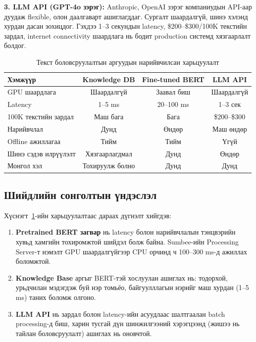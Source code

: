 \textbf{3. LLM API (GPT-4o зэрэг):}
Anthropic, OpenAI зэрэг компаниудын API-аар дуудаж flexible, олон даалгаварт ашиглагддаг. Сургалт шаардалгүй, шинэ хэлэнд хурдан дасан зохицдог. Гэхдээ 1--3 секундын latency, \$200--\$300/100K текстийн зардал, internet connectivity шаардлага нь бодит production системд хязгаарлалт болдог.

\begin{table}[h!]
\centering
\renewcommand{\arraystretch}{1.5}
\begin{tabular}{|l|c|c|c|}
\hline
\textbf{Хэмжүүр} & \textbf{Knowledge DB} & \textbf{Fine-tuned BERT} & \textbf{LLM API} \\ \hline
GPU шаардлага & Шаардалгүй & Заавал биш & Шаардалгүй \\ \hline
Latency & 1--5 ms & 20--100 ms & 1--3 сек \\ \hline
100K текстийн зардал & Маш бага & Бага & \$200--\$300 \\ \hline
Нарийвчлал & Дунд & Өндөр & Маш өндөр \\ \hline
Offline ажиллагаа & Тийм & Тийм & Үгүй \\ \hline
Шинэ сэдэв илрүүлэлт & Хязгаарлагдмал & Дунд & Өндөр \\ \hline
Монгол хэл & Тохируулж болно & Дунд & Дунд \\ \hline
\end{tabular}
\caption{Текст боловсруулалтын аргуудын нарийвчилсан харьцуулалт}
\label{tab:method_comparison}
\end{table}

\subsection{Шийдлийн сонголтын үндэслэл}

Хүснэгт~\ref{tab:method_comparison}-ийн харьцуулалтаас дараах дүгнэлт хийгдэв:

\begin{enumerate}
    \item \textbf{Pretrained BERT загвар} нь latency болон нарийвчлалын тэнцвэрийн хувьд хамгийн тохиромжтой шийдэл болж байна. Sumbee-ийн Processing Server-т нэмэлт GPU шаардалгүйгээр CPU орчинд ч 100--300 ms-д ажиллах боломжтой.
    \item \textbf{Knowledge Base} аргыг BERT-тэй хослуулан ашиглах нь: тодорхой, урьдчилан мэдэгдэж буй нэр томьёо, байгуулллагын нэрийг маш хурдан (1--5 ms) таних боломж олгоно.
    \item \textbf{LLM API} нь зардал болон latency-ийн асуудлаас шалтгаалан batch processing-д биш, харин тусгай дүн шинжилгээний хэрэгцээнд (жишээ нь тайлан боловсруулалт) ашиглах нь оновчтой.
\end{enumerate}

